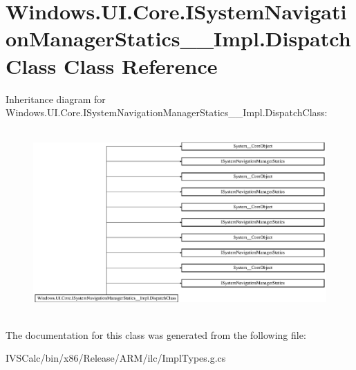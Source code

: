 \hypertarget{class_windows_1_1_u_i_1_1_core_1_1_i_system_navigation_manager_statics_____impl_1_1_dispatch_class}{}\section{Windows.\+U\+I.\+Core.\+I\+System\+Navigation\+Manager\+Statics\+\_\+\+\_\+\+Impl.\+Dispatch\+Class Class Reference}
\label{class_windows_1_1_u_i_1_1_core_1_1_i_system_navigation_manager_statics_____impl_1_1_dispatch_class}
Inheritance diagram for Windows.\+U\+I.\+Core.\+I\+System\+Navigation\+Manager\+Statics\+\_\+\+\_\+\+Impl.\+Dispatch\+Class\+:\begin{figure}[H]
\begin{center}
\leavevmode
\includegraphics[height=7.129629cm]{class_windows_1_1_u_i_1_1_core_1_1_i_system_navigation_manager_statics_____impl_1_1_dispatch_class}
\end{center}
\end{figure}


The documentation for this class was generated from the following file\+:\begin{DoxyCompactItemize}
\item 
I\+V\+S\+Calc/bin/x86/\+Release/\+A\+R\+M/ilc/Impl\+Types.\+g.\+cs\end{DoxyCompactItemize}
